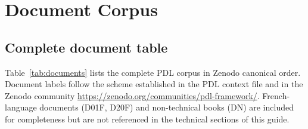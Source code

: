 \documentclass[11pt,a4paper]{article}
\theoremstyle{plain}
\theoremstyle{definition}
\theoremstyle{remark}
\begin{document}
\section{Document Corpus}
\label{sec:corpus}

\subsection{Complete document table}
\label{subsec:doc_table}

Table~\ref{tab:documents} lists the complete PDL corpus in Zenodo canonical order.
Document labels follow the scheme established in the PDL context file and in the Zenodo community \url{https://zenodo.org/communities/pdl-framework/}.
French-language documents (D01F, D20F) and non-technical books (DN) are included for completeness but are not referenced in the technical sections of this guide.

\setlength{\LTpre}{12pt}
\setlength{\LTpost}{6pt}
\end{document}
